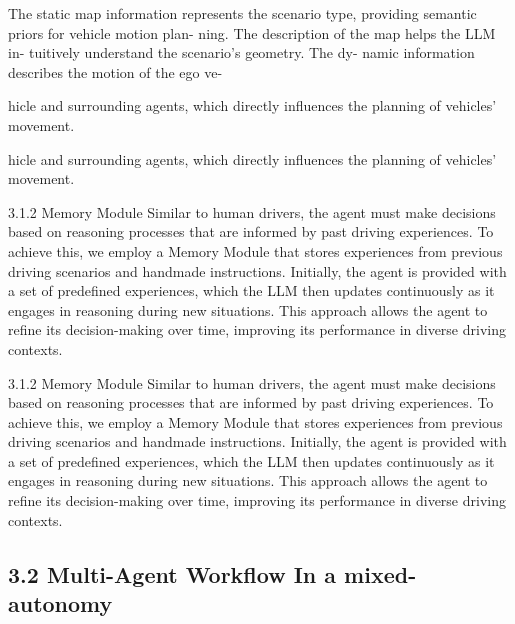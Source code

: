 \documentclass[12pt]{article}
\begin{document}
The static map information represents the scenario
type, providing semantic priors for vehicle motion plan-
ning. The description of the map helps the LLM in-
tuitively understand the scenario’s geometry. The dy-
namic information describes the motion of the ego ve-


hicle and surrounding agents, which directly influences
the planning of vehicles’ movement.


hicle and surrounding agents, which directly influences
the planning of vehicles’ movement.


3.1.2 Memory Module Similar to human drivers,
the agent must make decisions based on reasoning
processes that are informed by past driving experiences.
To achieve this, we employ a Memory Module that
stores experiences from previous driving scenarios and
handmade instructions. Initially, the agent is provided
with a set of predefined experiences, which the LLM
then updates continuously as it engages in reasoning
during new situations. This approach allows the agent
to refine its decision-making over time, improving its
performance in diverse driving contexts.


3.1.2 Memory Module Similar to human drivers,
the agent must make decisions based on reasoning
processes that are informed by past driving experiences.
To achieve this, we employ a Memory Module that
stores experiences from previous driving scenarios and
handmade instructions. Initially, the agent is provided
with a set of predefined experiences, which the LLM
then updates continuously as it engages in reasoning
during new situations. This approach allows the agent
to refine its decision-making over time, improving its
performance in diverse driving contexts.


\subsection{3.2 Multi-Agent Workflow In a mixed-autonomy}
\end{document}
